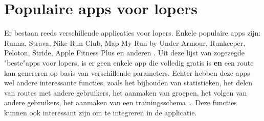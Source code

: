 \section{Populaire apps voor lopers}

Er bestaan reeds verschillende applicaties voor lopers. Enkele populaire apps zijn:
Runna, Strava, Nike Run Club, Map My Run by Under Armour, Runkeeper, Peloton, Stride, Apple Fitness Plus en anderen \autocite{Downey2023}.
Uit deze lijst van zogezegde "beste"\@ apps voor lopers,
is er geen enkele app die volledig gratis is \textbf{en} een route kan genereren op basis van verschillende parameters.
Echter hebben deze apps wel andere interessante functies, zoals het bijhouden van statistieken, het delen van routes met andere gebruikers,
het aanmaken van groepen, het volgen van andere gebruikers, het aanmaken van een trainingsschema \ldots \@
Deze functies kunnen ook interessant zijn om te integreren in de applicatie.







